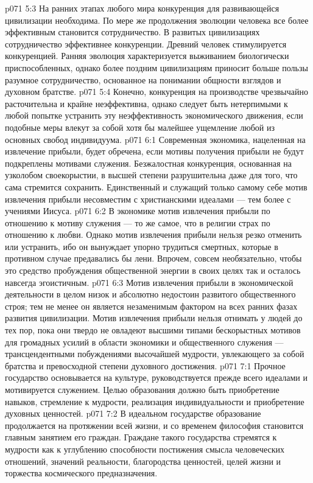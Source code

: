 \vs p071 5:3 На ранних этапах любого мира конкуренция для развивающейся цивилизации необходима. По мере же продолжения эволюции человека все более эффективным становится сотрудничество. В развитых цивилизациях сотрудничество эффективнее конкуренции. Древний человек стимулируется конкуренцией. Ранняя эволюция характеризуется выживанием биологически приспособленных, однако более поздним цивилизациям приносит больше пользы разумное сотрудничество, основанное на понимании общности взглядов и духовном братстве.
\vs p071 5:4 Конечно, конкуренция на производстве чрезвычайно расточительна и крайне неэффективна, однако следует быть нетерпимыми к любой попытке устранить эту неэффективность экономического движения, если подобные меры влекут за собой хотя бы малейшее ущемление любой из основных свобод индивидуума.
\vs p071 6:1 Современная экономика, нацеленная на извлечение прибыли, будет обречена, если мотивы получения прибыли не будут подкреплены мотивами служения. Безжалостная конкуренция, основанная на узколобом своекорыстии, в высшей степени разрушительна даже для того, что сама стремится сохранить. Единственный и служащий только самому себе мотив извлечения прибыли несовместим с христианскими идеалами --- тем более с учениями Иисуса.
\vs p071 6:2 В экономике мотив извлечения прибыли по отношению к мотиву служения --- то же самое, что в религии страх по отношению к любви. Однако мотив извлечения прибыли нельзя резко отменить или устранить, ибо он вынуждает упорно трудиться смертных, которые в противном случае предавались бы лени. Впрочем, совсем необязательно, чтобы это средство пробуждения общественной энергии в своих целях так и осталось навсегда эгоистичным.
\vs p071 6:3 Мотив извлечения прибыли в экономической деятельности в целом низок и абсолютно недостоин развитого общественного строя; тем не менее он является незаменимым фактором на всех ранних фазах развития цивилизации. Мотив извлечения прибыли нельзя отнимать у людей до тех пор, пока они твердо не овладеют высшими типами бескорыстных мотивов для громадных усилий в области экономики и общественного служения --- трансцендентными побуждениями высочайшей мудрости, увлекающего за собой братства и превосходной степени духовного достижения.
\vs p071 7:1 Прочное государство основывается на культуре, руководствуется прежде всего идеалами и мотивируется служением. Целью образования должно быть приобретение навыков, стремление к мудрости, реализация индивидуальности и приобретение духовных ценностей.
\vs p071 7:2 В идеальном государстве образование продолжается на протяжении всей жизни, и со временем философия становится главным занятием его граждан. Граждане такого государства стремятся к мудрости как к углублению способности постижения смысла человеческих отношений, значений реальности, благородства ценностей, целей жизни и торжества космического предназначения.
